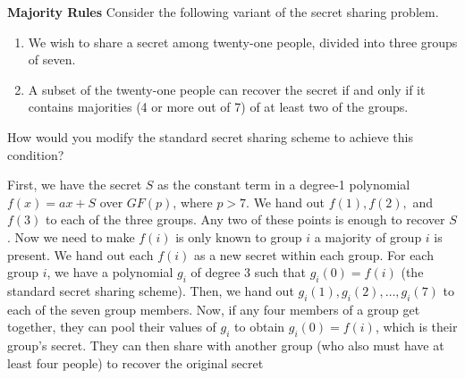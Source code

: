 \question \textbf{Majority Rules} \newline
Consider the following variant of the secret sharing problem. 
\begin{enumerate}[label=(\alph*)]
\item We wish to share a secret among twenty-one people, divided into three groups of seven.

\item A subset of the twenty-one people can recover the secret if and only if it contains majorities (4 or more out of 7) of at least two of the groups. 
\end{enumerate}

How would you modify the standard secret sharing scheme to achieve this condition? 
\begin{solution}
First, we have the secret $S$ as the constant term in a degree-1 polynomial $f(x) = ax + S$ over $GF(p)$, where $p > 7$. We hand out $f(1), f(2),$ and $f(3)$ to each of the three groups. Any two of these points is enough to recover $S$. 
Now we need to make $f(i)$ is only known to group $i$ a majority of group $i$ is present.
We hand out each $f(i)$ as a new secret within each group. For each group $i$, we have a polynomial $g_i$ of degree 3 such that $g_i(0) = f(i)$ (the standard secret sharing scheme). Then, we hand out $g_i(1), g_i(2), \dotsc , g_i(7)$ to each of the seven group members. Now, if any four members of a group get together, they can pool their values of $g_i$  to obtain $g_i(0) = f(i)$, which is their group’s secret. They can then share with another group (who also must have at least four people) to recover the original secret
\end{solution}